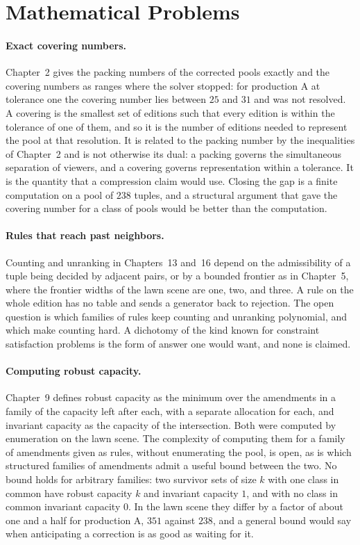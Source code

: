 \documentclass[11pt,twoside,openright]{book}
\theoremstyle{plain}
\theoremstyle{definition}
\theoremstyle{remark}
\begin{document}
\section{Mathematical Problems}\label{sec:math18}

\paragraph{Exact covering numbers.} Chapter~2 gives the packing numbers of the corrected pools exactly and the covering numbers as ranges where the solver stopped: for production A at tolerance one the covering number lies between $25$ and $31$ and was not resolved. A covering is the smallest set of editions such that every edition is within the tolerance of one of them, and so it is the number of editions needed to represent the pool at that resolution. It is related to the packing number by the inequalities of Chapter~2 and is not otherwise its dual: a packing governs the simultaneous separation of viewers, and a covering governs representation within a tolerance. It is the quantity that a compression claim would use. Closing the gap is a finite computation on a pool of $238$ tuples, and a structural argument that gave the covering number for a class of pools would be better than the computation.

\paragraph{Rules that reach past neighbors.} Counting and unranking in Chapters~13 and~16 depend on the admissibility of a tuple being decided by adjacent pairs, or by a bounded frontier as in Chapter~5, where the frontier widths of the lawn scene are one, two, and three. A rule on the whole edition has no table and sends a generator back to rejection. The open question is which families of rules keep counting and unranking polynomial, and which make counting hard. A dichotomy of the kind known for constraint satisfaction problems is the form of answer one would want, and none is claimed.

\paragraph{Computing robust capacity.} Chapter~9 defines robust capacity as the minimum over the amendments in a family of the capacity left after each, with a separate allocation for each, and invariant capacity as the capacity of the intersection. Both were computed by enumeration on the lawn scene. The complexity of computing them for a family of amendments given as rules, without enumerating the pool, is open, as is which structured families of amendments admit a useful bound between the two. No bound holds for arbitrary families: two survivor sets of size $k$ with one class in common have robust capacity $k$ and invariant capacity $1$, and with no class in common invariant capacity $0$. In the lawn scene they differ by a factor of about one and a half for production A, $351$ against $238$, and a general bound would say when anticipating a correction is as good as waiting for it.
\end{document}
